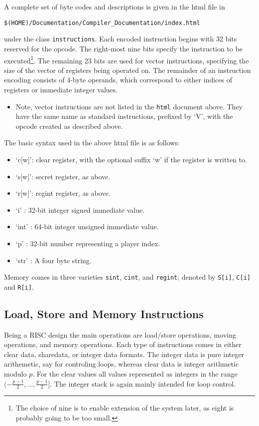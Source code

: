 A complete set of byte codes and descriptions is
given in the html file in 
\begin{center}
   \verb+$(HOME)/Documentation/Compiler_Documentation/index.html+
\end{center}
under the class \verb+instructions+.
Each encoded instruction begins with 32 bits reserved for the opcode.
The right-most nine bits specify the instruction to be executed\footnote{The choice of nine is to enable extension of the system later, as eight is probably going 
to be too small.}.
The remaining 23 bits are used for vector instructions, specifying the
size of the vector of registers being operated on.
The remainder of an instruction encoding consists of 4-byte operands, which
correspond to either indices of registers or immediate integer values.
\begin{itemize}
\item Note, vector instructions are not listed in the \verb+html+ document above.
They have the same name as standard instructions, prefixed by `V',
with the opcode created as described above.
\end{itemize}
The basic syntax used in the above html file is as follows:
\begin{itemize}
\item `c[w]': clear register, with the optional suffix `w' if the register is
written to.
\item `s[w]': secret register, as above.
\item `r[w]': regint register, as above.
\item `i'   : 32-bit integer signed immediate value.
\item `int' : 64-bit integer unsigned immediate value.
\item `p'   : 32-bit number representing a player index.
\item `str' : A four byte string.
\end{itemize}
Memory comes in three varieties \verb+sint+, \verb+cint+, and
\verb+regint+; denoted by \verb+S[i]+, \verb+C[i]+ and \verb+R[i]+.

\subsection{Load, Store and Memory Instructions}
Being a RISC design the main operations are load/store
operations, moving operations, and memory operations.
Each type of instructions comes in either clear data, 
sharedata, or integer data formats. 
The integer data is pure integer arithemetic, say
for controling loops, whereas clear data is integer
arithmetic modulo $p$.
For the clear values all values represented as integers 
in the range $(-\frac{p-1}{2}, \dots, \frac{p-1}{2}]$.
The integer stack is again mainly intended for loop
control.


